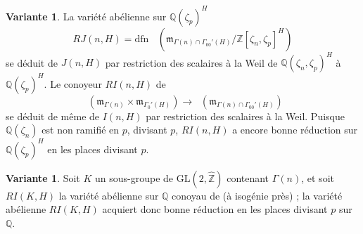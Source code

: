 \documentclass[10pt,a4paper]{amsart}
\theoremstyle{plain}
\theoremstyle{definition}
\newtheorem{variante}[theorem]{Variante}
\DeclareMathOperator{\Pico}{Pic^0}
\newcommand{\m}{\mathfrak{m}}
\newcommand{\ZZ}{\mathbb{Z}}
\newcommand{\QQ}{\mathbb{Q}}
\newcommand{\GL}{\mathrm{GL}}
\begin{document}
\begin{variante}
La vari\'et\'e ab\'elienne sur $\QQ(\zeta_p)^H$
\[
RJ(n,H) = \text{dfn } \Pico(\m_{\Gamma(n) \cap \Gamma_{00}'(H)} / \ZZ[\zeta_n,\zeta_p]^H)
\]
se d\'eduit de $J(n,H)$ par restriction des scalaires \`a la Weil de $\QQ(\zeta_n,\zeta_p)^H$ \`a $\QQ(\zeta_p)^H$. Le conoyeur $RI(n,H)$ de
\[
\Pico(\m_{\Gamma(n)} \times \m_{\Gamma_0'(H)}) \to \Pico(\m_{\Gamma(n) \cap \Gamma_{00}'(H)})
\]
se d\'eduit de m\^eme de $I(n,H)$ par restriction des scalaires \`a la Weil. Puisque $\QQ(\zeta_n)$ est non ramifi\'e en $p$, divisant $p$, $RI(n,H)$ a encore bonne r\'eduction sur $\QQ(\zeta_p)^H$ en les places divisant $p$.
\end{variante}

\begin{variante}
Soit $K$ un sous-groupe de $\GL(2,\hat{\ZZ})$ contenant $\Gamma(n)$, et soit $RI(K,H)$ la vari\'et\'e ab\'elienne sur $\QQ$ conoyau de (\`a isog\'enie pr\`es) ; la vari\'et\'e ab\'elienne $RI(K,H)$ acquiert donc bonne r\'eduction en les places divisant $p$ sur $\QQ$.
\end{variante}
\end{document}
